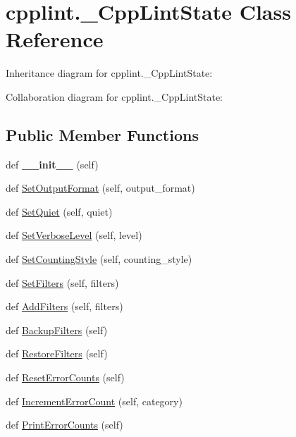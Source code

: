 \hypertarget{classcpplint_1_1__CppLintState}{}\section{cpplint.\+\_\+\+Cpp\+Lint\+State Class Reference}
\label{classcpplint_1_1__CppLintState}


Inheritance diagram for cpplint.\+\_\+\+Cpp\+Lint\+State\+:


Collaboration diagram for cpplint.\+\_\+\+Cpp\+Lint\+State\+:
\subsection*{Public Member Functions}
\begin{DoxyCompactItemize}
\item 
\mbox{\label{classcpplint_1_1__CppLintState_a9cc2db6b8d2e3b757fc48fb3c2fd4d8b}} 
def {\bfseries \+\_\+\+\_\+init\+\_\+\+\_\+} (self)
\item 
def \hyperlink{classcpplint_1_1__CppLintState_ab43553d2e2027b58d08a7001c71c0902}{Set\+Output\+Format} (self, output\+\_\+format)
\item 
def \hyperlink{classcpplint_1_1__CppLintState_ae97361d7a7428a9788e8200ae2e20374}{Set\+Quiet} (self, quiet)
\item 
def \hyperlink{classcpplint_1_1__CppLintState_ad4f97c907cc79e8d60237d0327830588}{Set\+Verbose\+Level} (self, level)
\item 
def \hyperlink{classcpplint_1_1__CppLintState_ac2503f2d8a357edd3ca648d219c7317e}{Set\+Counting\+Style} (self, counting\+\_\+style)
\item 
def \hyperlink{classcpplint_1_1__CppLintState_a359d4516eac0c1dce6223cf18181ac80}{Set\+Filters} (self, filters)
\item 
def \hyperlink{classcpplint_1_1__CppLintState_a248c70895572f2468d3c842faff2f285}{Add\+Filters} (self, filters)
\item 
def \hyperlink{classcpplint_1_1__CppLintState_a2444e784910e03681de22f43d4077dd1}{Backup\+Filters} (self)
\item 
def \hyperlink{classcpplint_1_1__CppLintState_a7a9c9fdfe033ebe1933450b4ae524598}{Restore\+Filters} (self)
\item 
def \hyperlink{classcpplint_1_1__CppLintState_ab802596abd5fba5e290e090388b6842a}{Reset\+Error\+Counts} (self)
\item 
def \hyperlink{classcpplint_1_1__CppLintState_a27a33a5049850d52cc8aef3478ca445a}{Increment\+Error\+Count} (self, category)
\item 
def \hyperlink{classcpplint_1_1__CppLintState_a3149156b00f8d53e5625256e3df2b4f0}{Print\+Error\+Counts} (self)
\end{DoxyCompactItemize}

